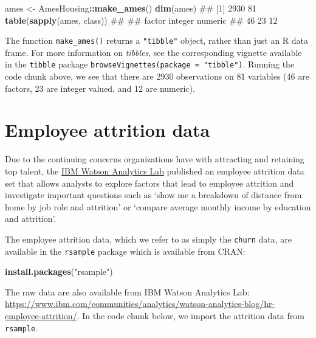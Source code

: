 \documentclass[]{book}
\newenvironment{Shaded}{\begin{snugshade}}{\end{snugshade}}
\newcommand{\KeywordTok}[1]{\textcolor[rgb]{0.13,0.29,0.53}{\textbf{#1}}}
\newcommand{\NormalTok}[1]{#1}
\newcommand{\OperatorTok}[1]{\textcolor[rgb]{0.81,0.36,0.00}{\textbf{#1}}}
\newcommand{\StringTok}[1]{\textcolor[rgb]{0.31,0.60,0.02}{#1}}
\theoremstyle{definition}
\theoremstyle{definition}
\theoremstyle{definition}
\theoremstyle{remark}
\begin{document}
\begin{Shaded}
\begin{Highlighting}[]
\NormalTok{ames <-}\StringTok{ }\NormalTok{AmesHousing}\OperatorTok{::}\KeywordTok{make_ames}\NormalTok{()}
\KeywordTok{dim}\NormalTok{(ames)}
\NormalTok{## [1] 2930   81}
\KeywordTok{table}\NormalTok{(}\KeywordTok{sapply}\NormalTok{(ames, class))}
\NormalTok{## }
\NormalTok{##  factor integer numeric }
\NormalTok{##      46      23      12}
\end{Highlighting}
\end{Shaded}

The function \texttt{make\_ames()} returns a \texttt{"tibble"} object,
rather than just an R data frame. For more information on
\emph{tibbles}, see the corresponding vignette available in the
\texttt{tibble} package \citep{R-tibble}
\texttt{browseVignettes(package\ =\ "tibble")}. Running the code chunk
above, we see that there are 2930 observations on 81 variables (46 are
factors, 23 are integer valued, and 12 are numeric).

\hypertarget{employee-attrition-data-1}{%
\section*{Employee attrition data}\label{employee-attrition-data-1}}

Due to the continuing concerns organizations have with attracting and
retaining top talent, the
\href{https://www.ibm.com/communities/analytics/watson-analytics-blog}{IBM
Watson Analytics Lab} published an employee attrition data set that
allows analysts to explore factors that lead to employee attrition and
investigate important questions such as `show me a breakdown of distance
from home by job role and attrition' or `compare average monthly income
by education and attrition'.

The employee attrition data, which we refer to as simply the
\texttt{churn} data, are available in the \texttt{rsample} package
\citep{pkg-rsample} which is available from CRAN:

\begin{Shaded}
\begin{Highlighting}[]
\KeywordTok{install.packages}\NormalTok{(}\StringTok{"rsample"}\NormalTok{)}
\end{Highlighting}
\end{Shaded}

The raw data are also available from IBM Watson Analytics Lab:
\url{https://www.ibm.com/communities/analytics/watson-analytics-blog/hr-employee-attrition/}.
In the code chunk below, we import the attrition data from
\texttt{rsample}.
\end{document}
